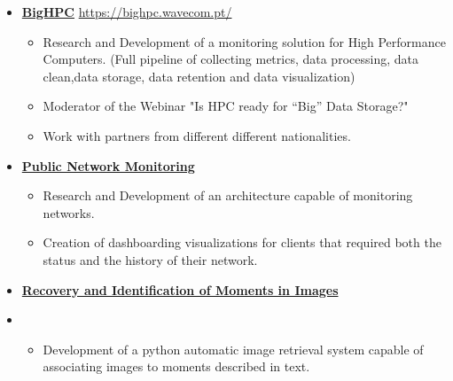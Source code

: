 \documentclass[10pt,a4paper,ragged2e,withhyper]{altacv}
\begin{document}
\begin{paracol}{2}
  

  \begin{itemize}
  \item[] \underline {\textbf{BigHPC}} \url{ https://bighpc.wavecom.pt/}
  \smallskip
  \begin{itemize}
      \item Research and Development of a monitoring solution for High Performance Computers. (Full pipeline of collecting metrics, data processing, data clean,data storage, data retention and data visualization)
      \item Moderator of the  Webinar "Is HPC ready for “Big” Data Storage?"
      \item Work with partners from different different nationalities.
  
    \end{itemize}

  \item[] \underline {\textbf{Public Network Monitoring}}
    \smallskip
      \begin{itemize}
      \item Research and Development of an architecture capable of monitoring networks.
      \item Creation of dashboarding visualizations for clients that required both the status and the history of their network. 
      \end{itemize}
    
\end{itemize}



  \divider

\begin{itemize}

\item[] \underline {\textbf{Recovery and Identification of Moments in Images}}
\item[] 
  \begin{itemize}
    \item Development of a python automatic image retrieval system capable of associating images to moments described in text.
 

\end{itemize}
\end{itemize}
\end{paracol}
\end{document}
